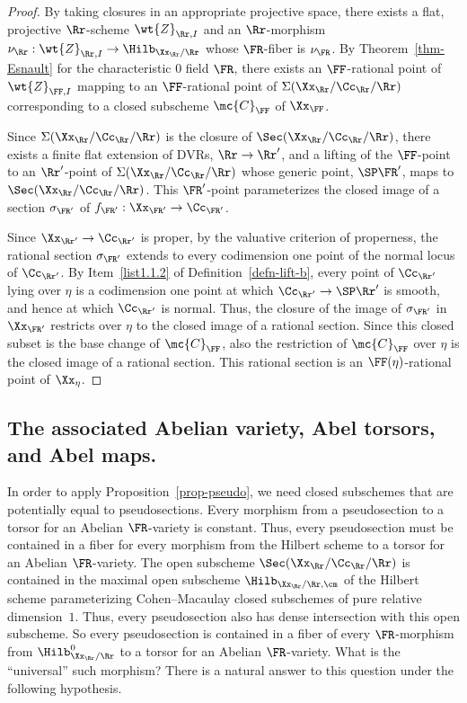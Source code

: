 \begin{proof}
By taking closures in an appropriate projective space, there exists a flat, projective $\Rr$-scheme $\wt{Z}_{\Rr,I}$ and an $\Rr$-morphism $\nu_{\Rr}:\wt{Z}_{\Rr,I} \to \Hilb_{\Xx_\Rr/\Rr}$ whose $\FR$-fiber is $\nu_\FR$. By Theorem~\ref{thm-Esnault} for the characteristic $0$ field $\FR$, there exists an $\FF$-rational point of $\wt{Z}_{\FF,I}$ mapping to an $\FF$-rational point of $\Sigma(\Xx_{\Rr}/\Cc_{\Rr}/\Rr)$ corresponding to a closed subscheme $\mc{C}_\FF$ of $\Xx_\FF$.

Since $\Sigma(\Xx_{\Rr}/\Cc_{\Rr}/\Rr)$ is the closure of $\Sec(\Xx_{\Rr}/\Cc_{\Rr}/\Rr)$, there exists a finite flat extension of DVRs, $\Rr\to \Rr'$, and a lifting of the $\FF$-point to an $\Rr'$-point of $\Sigma(\Xx_{\Rr}/\Cc_{\Rr}/\Rr)$ whose generic point, $\SP \FR'$, maps to $\Sec(\Xx_{\Rr}/\Cc_{\Rr}/\Rr)$. This $\FR'$-point parameterizes the closed image of a section $\sigma_{\FR'}$ of $f_{\FR'}:\Xx_{\FR'}\to \Cc_{\FR'}$.

Since $\Xx_{\Rr'}\to \Cc_{\Rr'}$ is proper, by the valuative criterion of properness, the rational section $\sigma_{\FR'}$ extends to every codimension one point of the normal locus of $\Cc_{\Rr'}$. By Item~\eqref{list1.1.2} of Definition~\ref{defn-lift-b}, every point of $\Cc_{\Rr'}$ lying over $\eta$ is a codimension one point at which $\Cc_{\Rr'}\to \SP \Rr'$ is smooth, and hence at which $\Cc_{\Rr'}$ is normal. Thus, the closure of the image of $\sigma_{\FR'}$ in $\Xx_{\FR'}$ restricts over $\eta$ to the closed image of a rational section. Since this closed subset is the base change of $\mc{C}_\FF$, also the restriction of $\mc{C}_\FF$ over $\eta$ is the closed image of a rational section. This rational section is an $\FF(\eta)$-rational point of $\Xx_\eta$.
\end{proof}

\subsection{The associated Abelian variety, Abel torsors, and Abel maps.} \label{subsec-Abelmap}
In order to apply Proposition~\ref{prop-pseudo}, we need closed subschemes that are potentially equal to pseudosections. Every morphism from a pseudosection to a torsor for an Abelian $\FR$-variety is constant. Thus, every pseudosection must be contained in a fiber for every morphism from the Hilbert scheme to a torsor for an Abelian $\FR$-variety. The open subscheme $\Sec(\Xx_\Rr/\Cc_\Rr/\Rr)$ is contained in the maximal open subscheme $\Hilb_{\Xx_\Rr/\Rr,\cm}$ of the Hilbert scheme parameterizing Cohen--Macaulay closed subschemes of pure relative dimension~$1$. Thus, every pseudosection also has dense intersection with this open subscheme. So every pseudosection is contained in a fiber of every $\FR$-morphism from $\Hilb^0_{\Xx_\Rr/\Rr}$ to a torsor for an Abelian $\FR$-variety. What is the ``universal'' such morphism? There is a natural answer to this question under the following hypothesis.

